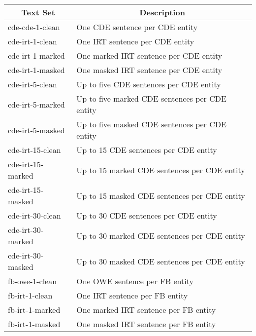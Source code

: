 \begin{tabular}{| l | l |}
    \hline

    \multicolumn{1}{|c|}{\textbf{Text Set}} &
    \multicolumn{1}{|c|}{\textbf{Description}} \\

    \hline \hline

    cde-cde-1-clean   & One CDE sentence per CDE entity                \\

    \hline

    cde-irt-1-clean   & One IRT sentence per CDE entity                \\
    cde-irt-1-marked  & One marked IRT sentence per CDE entity         \\
    cde-irt-1-masked  & One masked IRT sentence per CDE entity         \\

    \hline

    cde-irt-5-clean   & Up to five CDE sentences per CDE entity        \\
    cde-irt-5-marked  & Up to five marked CDE sentences per CDE entity \\
    cde-irt-5-masked  & Up to five masked CDE sentences per CDE entity \\

    \hline

    cde-irt-15-clean  & Up to 15 CDE sentences per CDE entity          \\
    cde-irt-15-marked & Up to 15 marked CDE sentences per CDE entity   \\
    cde-irt-15-masked & Up to 15 masked CDE sentences per CDE entity   \\

    \hline

    cde-irt-30-clean  & Up to 30 CDE sentences per CDE entity          \\
    cde-irt-30-marked & Up to 30 marked CDE sentences per CDE entity   \\
    cde-irt-30-masked & Up to 30 masked CDE sentences per CDE entity   \\

    \hline \hline

    fb-owe-1-clean    & One OWE sentence per FB entity                 \\

    \hline

    fb-irt-1-clean    & One IRT sentence per FB entity                 \\
    fb-irt-1-marked   & One marked IRT sentence per FB entity          \\
    fb-irt-1-masked   & One masked IRT sentence per FB entity          \\


\end{tabular}
